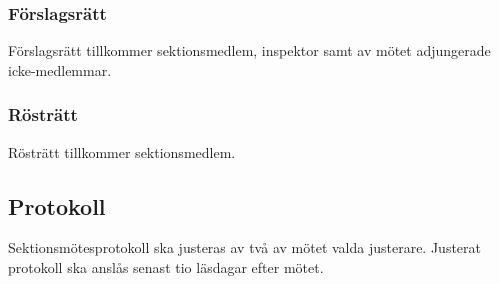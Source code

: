 \subsubsection{Förslagsrätt}
Förslagsrätt tillkommer sektionsmedlem, inspektor samt av mötet adjungerade icke-medlemmar.
\subsubsection{Rösträtt}
Rösträtt tillkommer sektionsmedlem.
\subsection{Protokoll}
Sektionsmötesprotokoll ska justeras av två av mötet valda justerare. Justerat protokoll ska anslås senast tio läsdagar efter mötet.
